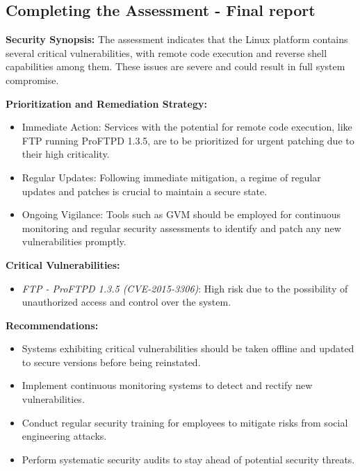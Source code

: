 \subsection{Completing the Assessment - Final report}

\textbf{Security Synopsis:}
The assessment indicates that the Linux platform contains several critical vulnerabilities, with remote code execution and reverse shell capabilities among them.
These issues are severe and could result in full system compromise.

\textbf{Prioritization and Remediation Strategy:}
\begin{itemize}
    \item Immediate Action: Services with the potential for remote code execution, like FTP running ProFTPD 1.3.5, are to be prioritized for urgent patching due to their high criticality.
    \item Regular Updates: Following immediate mitigation, a regime of regular updates and patches is crucial to maintain a secure state.
    \item Ongoing Vigilance: Tools such as GVM should be employed for continuous monitoring and regular security assessments to identify and patch any new vulnerabilities promptly.
\end{itemize}

\textbf{Critical Vulnerabilities:}
\begin{itemize}
    \item \textit{FTP - ProFTPD 1.3.5 (CVE-2015-3306)}: High risk due to the possibility of unauthorized access and control over the system.
\end{itemize}

\textbf{Recommendations:}
\begin{itemize}
    \item Systems exhibiting critical vulnerabilities should be taken offline and updated to secure versions before being reinstated.
    \item Implement continuous monitoring systems to detect and rectify new vulnerabilities.
    \item Conduct regular security training for employees to mitigate risks from social engineering attacks.
    \item Perform systematic security audits to stay ahead of potential security threats.
\end{itemize}




